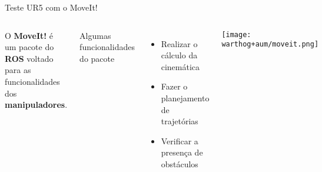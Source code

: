 \begin{frame}[t]{Teste UR5 com o MoveIt!} 
    \vspace*{0.3cm}
    \centering
    \begin{columns}[c]
 
        O \textbf{MoveIt!} é um pacote do \textbf{ROS} voltado para as funcionalidades dos \textbf{manipuladores}. 

        \vspace*{0.3cm}
        Algumas funcionalidades do pacote
        \begin{itemize}
            \item Realizar o cálculo da cinemática
            \item Fazer o planejamento de trajetórias
            \item Verificar a presença de obstáculos
        \end{itemize}
        \vspace*{0.3cm}

        \centering
        \texttt{[image: warthog+aum/moveit.png]}

        \vspace*{0.8cm}

    
    \end{columns}

\end{frame}
